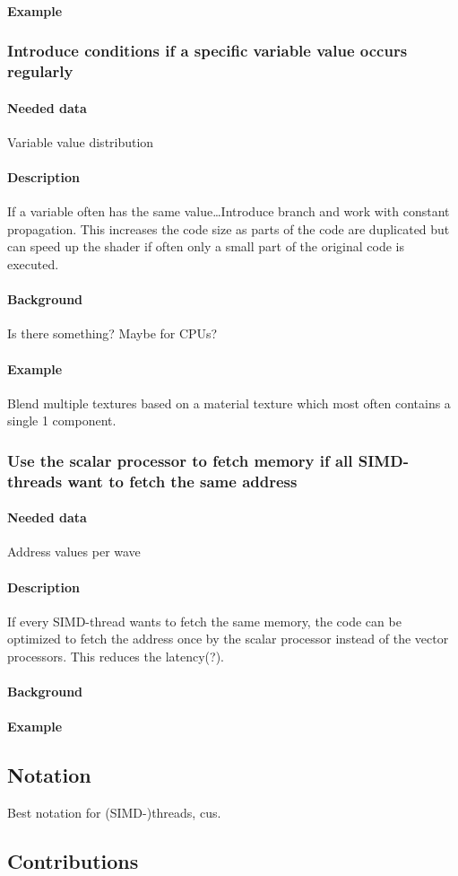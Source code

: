 \paragraph{Example}
	
\subsubsection{Introduce conditions if a specific variable value occurs regularly}
\paragraph{Needed data} Variable value distribution
\paragraph{Description} If a variable often has the same value\dots Introduce branch and work with constant propagation. This increases the code size as parts of the code are duplicated but can speed up the shader if often only a small part of the original code is executed.
\paragraph{Background} Is there something? Maybe for CPUs?
\paragraph{Example} Blend multiple textures based on a material texture which most often contains a single 1 component.
	
\subsubsection{Use the scalar processor to fetch memory if all SIMD-threads want to fetch the same address}
\paragraph{Needed data} Address values per wave
\paragraph{Description} If every SIMD-thread wants to fetch the same memory, the code can be optimized to fetch the address once by the scalar processor instead of the vector processors. This reduces the latency(?).
\paragraph{Background}
\paragraph{Example}

\subsection{Notation}
\label{sub:notation}
Best notation for (SIMD-)threads, \glspl{cu}.

\subsection{Contributions}
\label{sub:contributions}
